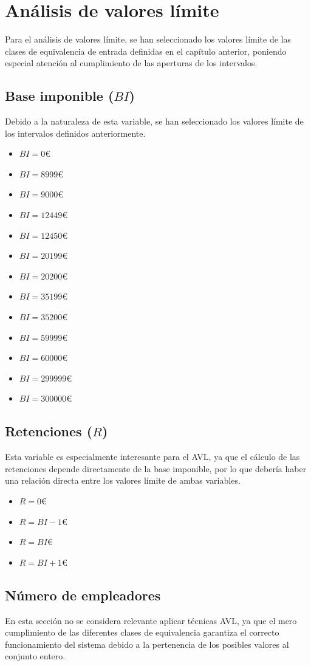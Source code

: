 \chapter{Análisis de valores límite}
Para el análisis de valores límite, se han seleccionado los valores límite de las clases de equivalencia
de entrada definidas en el capítulo anterior, poniendo especial atención al cumplimiento de las aperturas
de los intervalos.

\section{Base imponible ($BI$)}
Debido a la naturaleza de esta variable, se han seleccionado los valores límite de los intervalos definidos
anteriormente.
\begin{itemize}
	\item $BI = 0$€
	\item $BI = 8999$€
	\item $BI = 9000$€
	\item $BI = 12449$€
	\item $BI = 12450$€
	\item $BI = 20199$€
	\item $BI = 20200$€
	\item $BI = 35199$€
	\item $BI = 35200$€
	\item $BI = 59999$€
	\item $BI = 60000$€
	\item $BI = 299999$€
	\item $BI = 300000$€
\end{itemize}
\newpage{}
\section{Retenciones ($R$)}
Esta variable es especialmente interesante para el AVL, ya que el cálculo de las retenciones depende
directamente de la base imponible, por lo que debería haber una relación directa entre los valores límite
de ambas variables.
\begin{itemize}
	\item $R = 0$€
	\item $R = BI - 1$€
	\item $R = BI$€
	\item $R = BI + 1$€
\end{itemize}

\section{Número de empleadores}
En esta sección no se considera relevante aplicar técnicas AVL, ya que el mero cumplimiento de las
diferentes clases de equivalencia garantiza el correcto funcionamiento del sistema debido a la pertenencia de
los posibles valores al conjunto entero.

